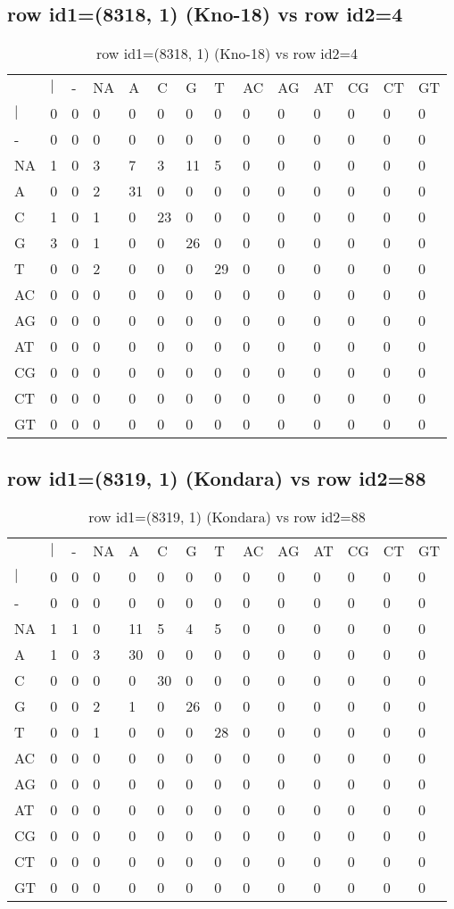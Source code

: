 \subsection{row id1=(8318, 1) (Kno-18) vs row id2=4}
\begin{center}
\begin{longtable}{|l|l|l|l|l|l|l|l|l|l|l|l|l|l|}
\caption{row id1=(8318, 1) (Kno-18) vs row id2=4} \label{table_dm508}\\
\hline
\\
\hline
&$|$&-&NA&A&C&G&T&AC&AG&AT&CG&CT&GT\\
$|$&0&0&0&0&0&0&0&0&0&0&0&0&0\\
-&0&0&0&0&0&0&0&0&0&0&0&0&0\\
NA&1&0&3&7&3&11&5&0&0&0&0&0&0\\
A&0&0&2&31&0&0&0&0&0&0&0&0&0\\
C&1&0&1&0&23&0&0&0&0&0&0&0&0\\
G&3&0&1&0&0&26&0&0&0&0&0&0&0\\
T&0&0&2&0&0&0&29&0&0&0&0&0&0\\
AC&0&0&0&0&0&0&0&0&0&0&0&0&0\\
AG&0&0&0&0&0&0&0&0&0&0&0&0&0\\
AT&0&0&0&0&0&0&0&0&0&0&0&0&0\\
CG&0&0&0&0&0&0&0&0&0&0&0&0&0\\
CT&0&0&0&0&0&0&0&0&0&0&0&0&0\\
GT&0&0&0&0&0&0&0&0&0&0&0&0&0\\
\hline
\end{longtable}
\end{center}

\subsection{row id1=(8319, 1) (Kondara) vs row id2=88}
\begin{center}
\begin{longtable}{|l|l|l|l|l|l|l|l|l|l|l|l|l|l|}
\caption{row id1=(8319, 1) (Kondara) vs row id2=88} \label{table_dm510}\\
\hline
\\
\hline
&$|$&-&NA&A&C&G&T&AC&AG&AT&CG&CT&GT\\
$|$&0&0&0&0&0&0&0&0&0&0&0&0&0\\
-&0&0&0&0&0&0&0&0&0&0&0&0&0\\
NA&1&1&0&11&5&4&5&0&0&0&0&0&0\\
A&1&0&3&30&0&0&0&0&0&0&0&0&0\\
C&0&0&0&0&30&0&0&0&0&0&0&0&0\\
G&0&0&2&1&0&26&0&0&0&0&0&0&0\\
T&0&0&1&0&0&0&28&0&0&0&0&0&0\\
AC&0&0&0&0&0&0&0&0&0&0&0&0&0\\
AG&0&0&0&0&0&0&0&0&0&0&0&0&0\\
AT&0&0&0&0&0&0&0&0&0&0&0&0&0\\
CG&0&0&0&0&0&0&0&0&0&0&0&0&0\\
CT&0&0&0&0&0&0&0&0&0&0&0&0&0\\
GT&0&0&0&0&0&0&0&0&0&0&0&0&0\\
\hline
\end{longtable}
\end{center}

